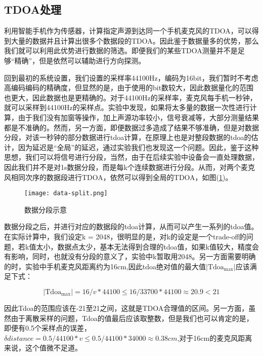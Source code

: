 \documentclass[winfonts]{njuthesis}
\begin{document}
		\subsection{TDOA处理}
		
		利用智能手机作为传感器，计算指定声源到达同一个手机麦克风的TDOA，可以得到大量的数据并且计算出很多个数据段的TDOA。因此鉴于数据量多的优势，那么我们就可以利用此优势进行数据的筛选。即便我们的某些TDOA测量并不是足够“精确”，但是依然可以辅助进行方向探测。
		
		回到最初的系统设置，我们设置的采样率44100Hz，编码为16bit，我们暂时不考虑高编码编码的精确度，但显然的是，由于使用的bit数较大，因此数据量化的范围也更大，因此数据也是更精确的。对于44100Hz的采样率，麦克风每手机一秒钟，就可以采样到44100Hz的采样点。实验中发现，如果将太多量的数据一次性进行计算，由于我们没有加窗等操作，加上声源功率较小，信号衰减等，大部分测量结果都是不准确的。然而，另一方面，即便数据过多造成了结果不够准确，但是对数据分段，对该一秒钟的部分数据进行tdoa计算，在原理上也是对整段数据的tdoa的估计，因为延迟是“全局”的延迟，通过实验我们也发现这一个问题。因此，鉴于这种思想，我们可以将信号进行分段，当然，由于在后续实验中设备会一直处理数据，因此我们并不是对1s数据分段，而是每k个连续数据进行分段。从而，对两个麦克风相同次序的数据段进行TDOA，依然可以得到全局的TDOA，如图(\ref{fig: data-split})。
		
		\begin{figure}[H]
			\centering
			\texttt{[image: data-split.png]} 
			\caption{{数据分段示意}}
			\label{fig: data-split}
		\end{figure}
		
		数据分段之后，并进行对应的数据段的tdoa计算，从而可以产生一系列的tdoa值。在实际计算中，我们设定k = 2048，很明显的是，对k的设定是一个trade-off的问题，若k值太小，数据点太少，基本无法得到合理的tdoa值，如果k值较大，精度会有影响，同时，也就没有分段的意义了，实验中k暂取用2048。另一方面需要明确的时，实验中手机麦克风距离约为16cm,因此tdoa绝对值的最大值$|\text{Tdoa}_{\text{max}}|$应该满足下式：
		
		\begin{equation}
			|\text{Tdoa}_{\text{max}}| = 16 / v * 44100 \leq 16 / 33700 * 44100  \approx 20.9 < 21
		\end{equation}
		
		因此Tdoa的范围应该在-21至21之间，这就是TDOA合理值的区间。另一方面，虽然由于离散采样的问题，Tdoa的值最后应该取整数，但是我们也可以肯定的是，即便有0.5个采样点的误差，$\delta distance = 0.5 / 44100 * v \leq 0.5 / 44100 * 34000 \approx 0.38cm$,对于16cm的麦克风距离来说，这个值微不足道。
		
\end{document}
